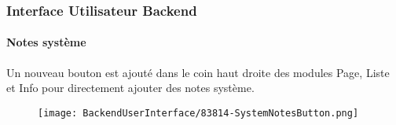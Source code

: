 %

\begin{frame}[fragile]
	\frametitle{Interface Utilisateur Backend}
	\framesubtitle{Notes système}

	Un nouveau bouton est ajouté dans le coin haut droite des modules Page,
	Liste et Info pour directement ajouter des notes système.

	\begin{figure}
		\texttt{[image: BackendUserInterface/83814-SystemNotesButton.png]}
	\end{figure}

\end{frame}

